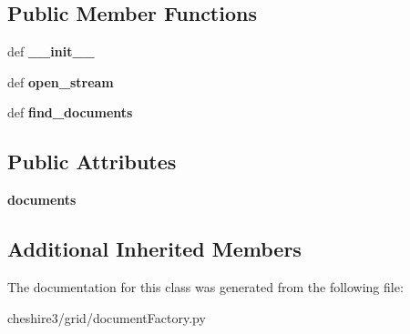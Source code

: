 \subsection*{Public Member Functions}
\begin{DoxyCompactItemize}
\item 
\hypertarget{classcheshire3_1_1grid_1_1document_factory_1_1_irods_file_document_stream_ac28c9d4a5ff8053378e008eeed470614}{def {\bfseries \-\_\-\-\_\-init\-\_\-\-\_\-}}\label{classcheshire3_1_1grid_1_1document_factory_1_1_irods_file_document_stream_ac28c9d4a5ff8053378e008eeed470614}

\item 
\hypertarget{classcheshire3_1_1grid_1_1document_factory_1_1_irods_file_document_stream_a8a3240cf1ff90afce4864b3f7337726b}{def {\bfseries open\-\_\-stream}}\label{classcheshire3_1_1grid_1_1document_factory_1_1_irods_file_document_stream_a8a3240cf1ff90afce4864b3f7337726b}

\item 
\hypertarget{classcheshire3_1_1grid_1_1document_factory_1_1_irods_file_document_stream_a1d776acc956d3e46a822f93556b83f7e}{def {\bfseries find\-\_\-documents}}\label{classcheshire3_1_1grid_1_1document_factory_1_1_irods_file_document_stream_a1d776acc956d3e46a822f93556b83f7e}

\end{DoxyCompactItemize}
\subsection*{Public Attributes}
\begin{DoxyCompactItemize}
\item 
\hypertarget{classcheshire3_1_1grid_1_1document_factory_1_1_irods_file_document_stream_a06a65ad90e370b75a81f7b1789024b0e}{{\bfseries documents}}\label{classcheshire3_1_1grid_1_1document_factory_1_1_irods_file_document_stream_a06a65ad90e370b75a81f7b1789024b0e}

\end{DoxyCompactItemize}
\subsection*{Additional Inherited Members}


The documentation for this class was generated from the following file\-:\begin{DoxyCompactItemize}
\item 
cheshire3/grid/document\-Factory.\-py\end{DoxyCompactItemize}
